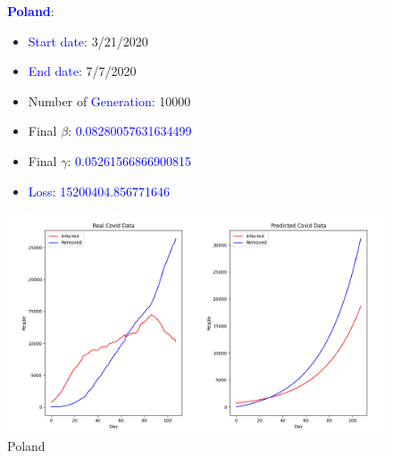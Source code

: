 \documentclass[a4paper]{article}
\begin{document}
     \begin{figure}[ht]
    \centering
    \textbf{\textcolor{blue}{Poland}}: 
    \begin{itemize}
        \item \textcolor{blue}{Start date}: 3/21/2020
        \item \textcolor{blue}{End date}: 7/7/2020
        \item Number of \textcolor{blue}{Generation}: 10000
        \item Final $\beta$: \textcolor{blue}{0.08280057631634499}
        \item Final $\gamma$: \textcolor{blue}{0.05261566866900815}
        \item \textcolor{blue}{Loss}: \textcolor{blue}{15200404.856771646}
    \end{itemize}
    \includegraphics[width= \linewidth]{ex5-plot/Poland.png}
    \caption{Poland}
     \end{figure}
     
\end{document}
